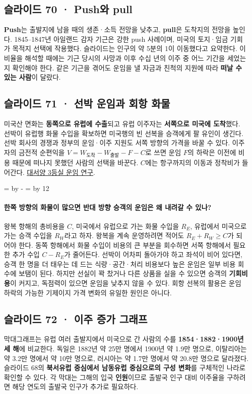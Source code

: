 \documentclass[10pt,a4paper]{article}
\newcommand{\ReserveQuestionSpace}{%
  \par\begingroup
  \dimen0=\pagegoal \advance\dimen0 by -\pagetotal
  \dimen2=\baselineskip \multiply\dimen2 by 12
  \ifdim\dimen0<\dimen2 \newpage\fi
  \endgroup}
\begin{document}
\subsection{슬라이드 70 · Push와 pull}
\textbf{Push}는 출발지에 남을 때의 생존·소득 전망을 낮추고, \textbf{pull}은 도착지의 전망을 높인다. 1845–1847년 아일랜드 감자 기근은 강한 push 사례이며, 미국의 토지·임금 기회가 목적지 선택에 작용했다. 슬라이드는 인구의 약 5분의 1이 이동했다고 요약한다. 이 비율을 해석할 때에는 기근 당시의 사망과 이후 수십 년의 이주 중 어느 기간을 세었는지 확인해야 한다. 같은 기근을 겪어도 운임을 낼 자금과 친척의 지원에 따라 \textbf{떠날 수 있는 사람}이 달랐다.\par

\subsection{슬라이드 71 · 선박 운임과 회항 화물}
미국산 면화는 \textbf{동쪽으로 유럽에 수출}되고 유럽 이주자는 \textbf{서쪽으로 미국에 도착}했다. 선박이 유럽행 화물 수입을 확보하면 미국행의 빈 선복을 승객에게 팔 유인이 생긴다. 선박 회사의 경쟁과 정부의 운임·이주 지원도 서쪽 방향의 가격을 바꿀 수 있다. 이주자의 금전적 순편익을 $V=W_{\mathrm{\mbox{도착}}}-W_{\mathrm{\mbox{출발}}}-F-C$로 쓰면 운임 $F$의 하락은 이전에 비용 때문에 떠나지 못했던 사람의 선택을 바꾼다. $C$에는 항구까지의 이동과 정착비가 들어간다. \href{https://onlinelibrary.wiley.com/doi/abs/10.1111/1468-0289.12014}{대서양 3등실 운임 연구}.\par

\ReserveQuestionSpace
\paragraph{한쪽 방향의 화물이 많으면 반대 방향 승객의 운임은 왜 내려갈 수 있나?}
왕복 항해의 총비용을 $C$, 미국에서 유럽으로 가는 화물 수입을 $R_E$, 유럽에서 미국으로 가는 승객 수입을 $R_W$라고 하자. 왕복을 계속 운영하려면 적어도 $R_E+R_W\geq C$가 되어야 한다. 동쪽 항해에서 화물 수입이 비용의 큰 부분을 회수하면 서쪽 항해에서 필요한 추가 수입 $C-R_E$가 줄어든다. 선박이 어차피 돌아가야 하고 좌석이 비어 있다면, 승객 한 명을 더 태우는 데 드는 식량·공간·처리 비용보다 높은 운임은 일부 비용 회수에 보탬이 된다. 하지만 선실이 꽉 찼거나 다른 상품을 실을 수 있으면 승객의 \textbf{기회비용}이 커지고, 독점력이 있으면 운임을 낮추지 않을 수 있다. 회항 선복의 활용은 운임 하락의 가능한 기제이지 가격 변화의 유일한 원인은 아니다.\par

\subsection{슬라이드 72 · 이주 증가 그래프}
막대그래프는 유럽 여러 출발지에서 미국으로 간 사람의 수를 \textbf{1854·1882·1900년 세 해}에 비교한다. 독일은 1882년 약 25만 명에서 1900년 약 1.9만 명으로, 이탈리아는 약 3.2만 명에서 약 10만 명으로, 러시아는 약 1.7만 명에서 약 20.8만 명으로 달라졌다. 슬라이드 68의 \textbf{북서유럽 중심에서 남동유럽 중심으로의 구성 변화}를 구체적인 나라로 확인할 수 있다. 각 막대는 그해의 입국 \textbf{인원}이므로 출발국 인구 대비 이주율을 구하려면 해당 연도의 출발국 인구가 추가로 필요하다.\par
\end{document}
